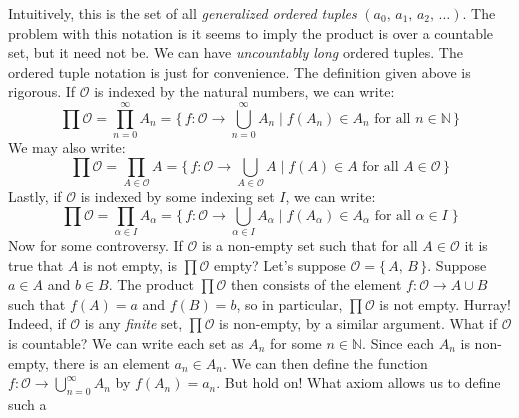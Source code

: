 \documentclass{article}
\theoremstyle{plain}
\theoremstyle{normal}
\begin{document}
        Intuitively, this is the set of all \textit{generalized ordered tuples}
        $(a_{0},\,a_{1},\,a_{2},\,\dots)$. The problem with this notation is
        it seems to imply the product is over a countable set, but it need not
        be. We can have \textit{uncountably long} ordered tuples. The ordered
        tuple notation is just for convenience. The definition given above is
        rigorous. If $\mathcal{O}$ is indexed by the natural numbers, we can
        write:
        \begin{equation}
            \prod\mathcal{O}=\prod_{n=0}^{\infty}A_{n}
                =\{\,f:\mathcal{O}\rightarrow\bigcup_{n=0}^{\infty}A_{n}\;|\;
                    f(A_{n})\in{A}_{n}\textrm{ for all }n\in\mathbb{N}\,\}
        \end{equation}
        We may also write:
        \begin{equation}
            \prod\mathcal{O}=\prod_{A\in\mathcal{O}}A=
                \{\,f:\mathcal{O}\rightarrow\bigcup_{A\in\mathcal{O}}A\;|\;
                    f(A)\in{A}\textrm{ for all }A\in\mathcal{O}\,\}
        \end{equation}
        Lastly, if $\mathcal{O}$ is indexed by some indexing set $I$, we can
        write:
        \begin{equation}
            \prod\mathcal{O}=\prod_{\alpha\in{I}}A_{\alpha}=
                \{\,f:\mathcal{O}\rightarrow\bigcup_{\alpha\in{I}}A_{\alpha}
                    \;|\;f(A_{\alpha})\in{A}_{\alpha}\textrm{ for all }
                        \alpha\in{I}\;\}
        \end{equation}
        Now for some controversy. If $\mathcal{O}$ is a non-empty set such that
        for all $A\in\mathcal{O}$ it is true that $A$ is not empty, is
        $\prod\mathcal{O}$ empty? Let's suppose $\mathcal{O}=\{\,A,\,B\,\}$.
        Suppose $a\in{A}$ and $b\in{B}$. The product $\prod\mathcal{O}$
        then consists of the element
        $f:\mathcal{O}\rightarrow{A}\cup{B}$ such that
        $f(A)=a$ and $f(B)=b$, so in particular,
        $\prod\mathcal{O}$ is not empty. Hurray! Indeed, if $\mathcal{O}$ is any
        \textit{finite} set, $\prod\mathcal{O}$ is non-empty, by a similar
        argument. What if $\mathcal{O}$ is countable? We can write each set as
        $A_{n}$ for some $n\in\mathbb{N}$. Since each $A_{n}$ is non-empty,
        there is an element $a_{n}\in{A}_{n}$. We can then define the function
        $f:\mathcal{O}\rightarrow\bigcup_{n=0}^{\infty}A_{n}$ by
        $f(A_{n})=a_{n}$. But hold on! What axiom allows us to define such a
\end{document}
